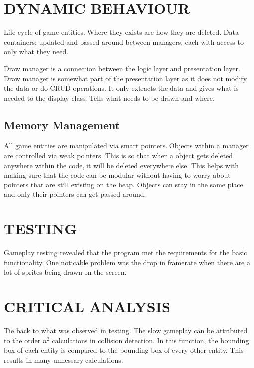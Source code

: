 \documentclass[10pt,twocolumn]{witseiepaper}
\begin{document}
\section{DYNAMIC BEHAVIOUR} %
Life cycle of game entities. Where they exists are how they are deleted. Data containers; updated and passed around between managers, each with access to only what they need. 

Draw manager is a connection between the logic layer and presentation layer. Draw manager is somewhat part of the presentation layer as it does not modify the data or do CRUD operations. It only extracts the data and gives what is needed to the display class. Tells what needs to be drawn and where.

\subsection{Memory Management}
All game entities are manipulated via smart pointers. Objects within a manager are controlled via weak pointers. This is so that when a object gets deleted anywhere within the code, it will be deleted everywhere else. This helps with making sure that the code can be modular without having to worry about pointers that are still existing on the heap. Objects can stay in the same place and only their pointers can get passed around.



%
\section{TESTING} %
Gameplay testing revealed that the program met the requirements for the basic functionality. One noticable problem was the drop in framerate when there are a lot of sprites being drawn on the screen.

%
\section{CRITICAL ANALYSIS} %
Tie back to what was observed in testing. The slow gameplay can be attributed to the order $ n^{2} $ calculations in collision detection. In this function, the bounding box of each entity is compared to the bounding box of every other entity. This results in many unnessary calculations.
\end{document}
